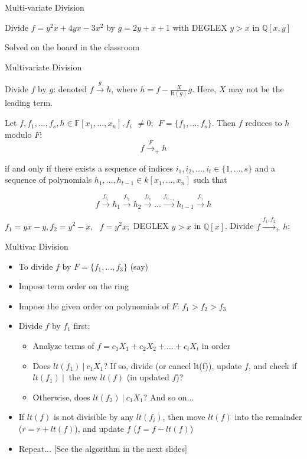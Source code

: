 \documentclass[xcolor=dvipsnames]{beamer}
\newcommand{\Q}{{\mathbb{Q}}}
\newcommand{\F}{{\mathbb{F}}}
\newcommand{\bi}{\begin{itemize}}
\newcommand{\ei}{\end{itemize}}
\begin{document}
\begin{frame}{{\large Multi-variate Division}}

Divide $f = y^2x+4yx - 3x^2$ by $g = 2y+x+1$ with DEGLEX $y>x$ in
$\Q[x, y]$

\pause
Solved on the board in the classroom

\end{frame}

\begin{frame}{{\large Multivariate Division}}

 Divide $f$ by $g$: denoted $f\stackrel{g}{\textstyle\longrightarrow}
 h$, where $h = f - \frac{X}{\text{lt}(g)} g$. Here, $X$ may not be
 the leading term. 

\begin{Definition}
Let $f, f_1, \dots, f_s, h \in \F[x_1, \dots, x_n], f_i ~~ \neq 0; ~~ F
= \{f_1, \dots, f_s\}$. Then $f$ reduces to $h$ modulo $F$:
\[
f\stackrel{F}{\textstyle\longrightarrow}_+ h
\]

if and only if there exists a sequence of indices $i_1, i_2, \dots,
i_t \in \{1, \dots, s\}$ and a sequence of polynomials $h_1, \dots,
h_{t-1} \in k[x_1, \dots, x_n]$ such that

\[
f\stackrel{f_{i_1}}{\textstyle\longrightarrow}h_1
\stackrel{f_{i_2}}{\textstyle\longrightarrow}h_2 
\stackrel{f_{i_3}}{\textstyle\longrightarrow} \dots
\stackrel{f_{i_{t-1}}}{\textstyle\longrightarrow}h_{t-1}
\stackrel{f_{i_{t}}}{\textstyle\longrightarrow}h
\]
\end{Definition}

$f_1 = yx - y, f_2 = y^2 - x, ~~~f = y^2x;$ DEGLEX $y>x$ in
$\Q[x]$. Divide $f \xrightarrow{f_1, f_2}_+ h$:

\end{frame}

\begin{frame}{{\large Multivar Division}}
\bi
\item To divide $f$ by $F =\{f_1, \dots, f_3\}$ (say)
\item Impose term order on the ring
\item Impose the given order on polynomials of $F$: $f_1 > f_2 > f_3$
\item Divide $f$ by $f_1$ first:
\bi
\item Analyze terms of $f = c_1X_1 + c_2X_2 + \dots + c_tX_t$ in order
\item Does $lt(f_1) ~|~ c_1X_1$? If so, divide (or cancel lt(f)),
  update $f$, and check if $lt(f_1) ~|~$ the new $lt(f)$ (in updated $f$)?
\item Otherwise, does $lt(f_2) ~|~ c_1X_1$? And so on...
\ei
\item If $lt(f)$ is not divisible by any $lt(f_i)$, then move $lt(f)$
  into the remainder ($r = r + lt(f)$), and update $f$ ($f = f - lt(f)$)
\item Repeat... [See the algorithm in the next slides]
\ei
\end{frame}
\end{document}
